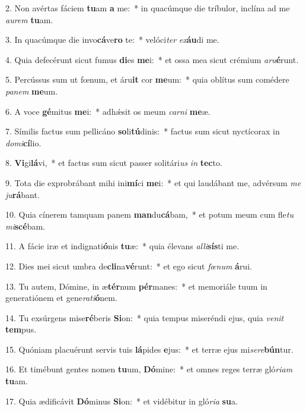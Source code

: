 2. Non avértas fáciem \textbf{tu}am \textbf{a} me:~*  in quacúmque die tríbulor, inclína ad me \textit{au}\textit{rem} \textbf{tu}am.\

3. In quacúmque die invo\textbf{cá}ve\textbf{ro} te:~*  velóci\textit{ter} \textit{ex}\textbf{áu}di me.\

4. Quia defecérunt sicut fumus \textbf{di}es \textbf{me}i:~*  et ossa mea sicut crémium \textit{a}\textit{ru}\textbf{é}runt.\

5. Percússus sum ut fœnum, et áru\textbf{it} cor \textbf{me}um:~*  quia oblítus sum comédere \textit{pa}\textit{nem} \textbf{me}um.\

6. A voce \textbf{gé}mitus \textbf{me}i:~*  adhǽsit os meum \textit{car}\textit{ni} \textbf{me}æ.\

7. Símilis factus sum pellicáno \textbf{so}li\textbf{tú}dinis:~*  factus sum sicut nyctícorax in \textit{do}\textit{mi}\textbf{cí}lio.\

8. \textbf{Vi}gi\textbf{lá}vi,~*  et factus sum sicut passer solitári\textit{us} \textit{in} \textbf{tec}to.\

9. Tota die exprobrábant mihi ini\textbf{mí}ci \textbf{me}i:~*  et qui laudábant me, advérsum \textit{me} \textit{ju}\textbf{rá}bant.\

10. Quia cínerem tamquam panem \textbf{man}du\textbf{cá}bam,~*  et potum meum cum fle\textit{tu} \textit{mi}\textbf{scé}bam.\

11. A fácie iræ et indignati\textbf{ó}nis \textbf{tu}æ:~*  quia élevans \textit{al}\textit{li}\textbf{sís}ti me.\

12. Dies mei sicut umbra de\textbf{cli}na\textbf{vé}runt:~*  et ego sicut \textit{fœ}\textit{num} \textbf{á}rui.\

13. Tu autem, Dómine, in æ\textbf{tér}num \textbf{pér}manes:~*  et memoriále tuum in generatiónem et gene\textit{ra}\textit{ti}\textbf{ó}nem.\

14. Tu exsúrgens mise\textbf{ré}beris \textbf{Si}on:~*  quia tempus miseréndi ejus, quia \textit{ve}\textit{nit} \textbf{tem}pus.\

15. Quóniam placuérunt servis tuis \textbf{lá}pides \textbf{e}jus:~*  et terræ ejus mi\textit{se}\textit{re}\textbf{bún}tur.\

16. Et timébunt gentes nomen \textbf{tu}um, \textbf{Dó}mine:~*  et omnes reges terræ gló\textit{ri}\textit{am} \textbf{tu}am.\

17. Quia ædificávit \textbf{Dó}minus \textbf{Si}on:~*  et vidébitur in gló\textit{ri}\textit{a} \textbf{su}a.\

